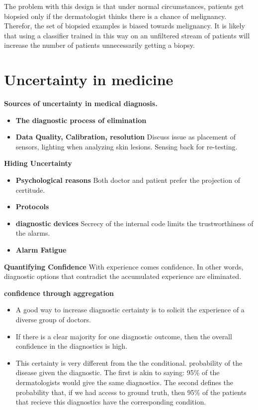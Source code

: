 \documentclass[10pt]{article}
\begin{document}
The problem with this design is that under normal circumstances, patients get
biopsied only if the dermatologist thinks there is a chance of
melignancy. Therefor, the set of biopsied examples is biased towards
melignancy. It is likely that using a classifier trained in this way
on an unfiltered stream of patients will increase the number of
patients unnecessarily getting a biopsy.

\section*{Uncertainty in medicine}

{\bf Sources of uncertainty in medical diagnosis.}
\begin{itemize}
  \item{\bf The diagnostic process of elimination}
  \item{\bf Data Quality, Calibration, resolution} Discuss issue as
    placement of sensors, lighting when analyzing skin lesions. Sensing back for re-testing.
  \end{itemize}

 {\bf Hiding Uncertainty}
  \begin{itemize}
    \item {\bf Psychological reasons} Both doctor and patient prefer
      the projection of certitude.
    \item {\bf Protocols}
    \item {\bf diagnostic devices} Secrecy of the internal code limits
      the trustworthiness of the alarms.
    \item{\bf Alarm Fatigue}
  \end{itemize}

  {\bf Quantifying Confidence} With experience comes confidence. In
  other words, diagnostic options that contradict the accumulated
  experience are eliminated.
  
  {\bf confidence through aggregation}
  \begin{itemize}
    \item A good way to increase diagnostic certainty is to solicit
      the experience of a diverse group of doctors.
    \item If there is a clear majority for one diagnostic outcome,
      then the overall confidence in the diagnostics is high.
    \item This certainty is very different from the the conditional.
      probability of the disease given the diagnostic. The first is
      akin to saying: 95\% of the dermatologists would give the same
      diagnostics. The second defines the probability that, if we had
      access to ground truth, then 95\% of the patients that recieve
      this diagnostics have the corresponding condition.
    \end{itemize}
    
\end{document}
